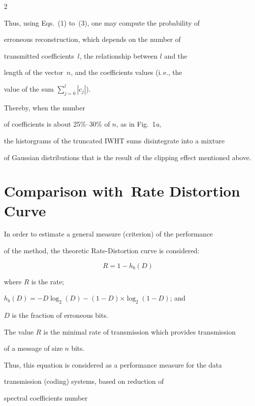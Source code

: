 \begin{multicols}{2}
%

Thus, using Eqs.~(1) to~(3), one may compute the probability of

erroneous reconstruction, which depends on the number of

transmitted coefficients~$l$, the relationship between $l$ and the

length of the vector~$n$, and the coefficients values (i.\,e., the

value of the sum $\sum\limits_{j=0}^{l} |c_j|$). 



Thereby, when the number 

of coefficients is about 25\%--30\% of $n$, as in Fig.~1\textit{a}, 

the historgrams of the truncated IWHT sums disintegrate into a mixture 

of Gaussian distributions that is the result of the clipping effect mentioned above.



\section{Comparison with~Rate Distortion Curve}



\noindent

In order to estimate a general measure (criterion) of the performance 

of the method, the theoretic Rate-Distortion curve is considered:

$$

R=1-h_b(D)

$$

where $R$ is the rate;

$

h_b(D)= -D\log_2(D)-(1-D)$\linebreak $\times\log_2(1-D)$; and

$D$ is the fraction of erroneous bits.



 The value $R$ is the minimal rate of transmission which provides transmission 

 of a message of size $n$ bits.

Thus,  this equation is considered as a performance measure for the data

transmission (coding) systems, based on reduction of

 spectral coefficients number 


\end{multicols}
